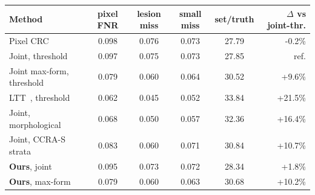 \begin{tabular}{lccccr}
\toprule
Method & pixel FNR & lesion miss & small miss & set/truth & $\Delta$ vs joint-thr. \\
\midrule
Pixel CRC~\cite{angelopoulos2024crc} & 0.098 & 0.076 & 0.073 & 27.79 & -0.2\% \\
Joint, threshold & 0.097 & 0.075 & 0.073 & 27.85 & ref. \\
Joint max-form, threshold & 0.079 & 0.060 & 0.064 & 30.52 & +9.6\% \\
LTT~\cite{angelopoulos2021ltt}, threshold & 0.062 & 0.045 & 0.052 & 33.84 & +21.5\% \\
Joint, morphological~\cite{mossina2025morph} & 0.068 & 0.050 & 0.057 & 32.36 & +16.4\% \\
Joint, CCRA-S strata~\cite{luo2025ccra} & 0.083 & 0.060 & 0.071 & 30.84 & +10.7\% \\
\textbf{Ours}, joint & 0.095 & 0.073 & 0.072 & 28.34 & +1.8\% \\
\textbf{Ours}, max-form & 0.079 & 0.060 & 0.063 & 30.68 & +10.2\% \\
\bottomrule
\end{tabular}
